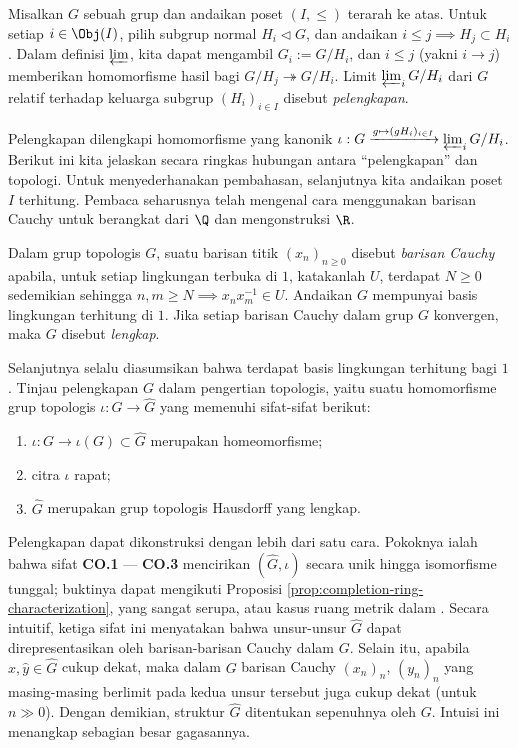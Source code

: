 \begin{definition}\label{def:group-completion} 
	Misalkan $G$ sebuah grup dan andaikan poset $(I, \leq)$ terarah ke atas. Untuk setiap $i \in \Obj(I)$, pilih subgrup normal $H_i \lhd G$, dan andaikan $i \leq j \implies H_j \subset H_i$. Dalam definisi $\varprojlim$, kita dapat mengambil $G_i := G/H_i$, dan $i \leq j$ (yakni $i \to j$) memberikan homomorfisme hasil bagi $G/H_j \twoheadrightarrow G/H_i$. Limit $\varprojlim_i G/H_i$ dari $G$ relatif terhadap keluarga subgrup $(H_i)_{i \in I}$ disebut \emph{pelengkapan}.
\end{definition}
Pelengkapan dilengkapi homomorfisme yang kanonik $\iota: G \xrightarrow{g \mapsto (gH_i)_{i \in I}} \varprojlim_i G/H_i$. Berikut ini kita jelaskan secara ringkas hubungan antara ``pelengkapan'' dan topologi. Untuk menyederhanakan pembahasan, selanjutnya kita andaikan poset $I$ terhitung. Pembaca seharusnya telah mengenal cara menggunakan barisan Cauchy untuk berangkat dari $\Q$ dan mengonstruksi $\R$.
\begin{definition}
	Dalam grup topologis $G$, suatu barisan titik $(x_n)_{n \geq 0}$ disebut \emph{barisan Cauchy} apabila, untuk setiap lingkungan terbuka di $1$, katakanlah $U$, terdapat $N \geq 0$ sedemikian sehingga $n, m \geq N \implies x_n x_m^{-1} \in U$. Andaikan $G$ mempunyai basis lingkungan terhitung di $1$. Jika setiap barisan Cauchy dalam grup $G$ konvergen, maka $G$ disebut \emph{lengkap}.
\end{definition}

Selanjutnya selalu diasumsikan bahwa terdapat basis lingkungan terhitung bagi $1$. Tinjau pelengkapan $G$ dalam pengertian topologis, yaitu suatu homomorfisme grup topologis $\iota: G \to \hat{G}$ yang memenuhi sifat-sifat berikut:
\begin{enumerate}[\bfseries {CO}.1]
	\item $\iota: G \to \iota(G) \subset \hat{G}$ merupakan homeomorfisme;
	\item citra $\iota$ rapat;
	\item $\hat{G}$ merupakan grup topologis Hausdorff yang lengkap.
\end{enumerate}
Pelengkapan dapat dikonstruksi dengan lebih dari satu cara. Pokoknya ialah bahwa sifat \textbf{CO.1} --- \textbf{CO.3} mencirikan $(\hat{G}, \iota)$ secara unik hingga isomorfisme tunggal; buktinya dapat mengikuti Proposisi \ref{prop:completion-ring-characterization}, yang sangat serupa, atau kasus ruang metrik dalam \cite[\S 8.1]{Xiong}. Secara intuitif, ketiga sifat ini menyatakan bahwa unsur-unsur $\hat{G}$ dapat direpresentasikan oleh barisan-barisan Cauchy dalam $G$. Selain itu, apabila $\hat{x}, \hat{y} \in \hat{G}$ cukup dekat, maka dalam $G$ barisan Cauchy $(x_n)_n$, $(y_n)_n$ yang masing-masing berlimit pada kedua unsur tersebut juga cukup dekat (untuk $n \gg 0$). Dengan demikian, struktur $\hat{G}$ ditentukan sepenuhnya oleh $G$. Intuisi ini menangkap sebagian besar gagasannya.

